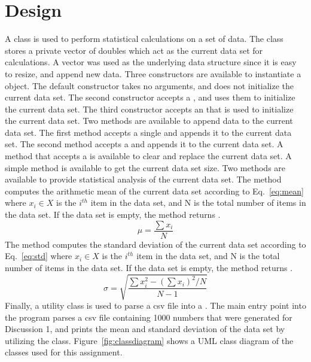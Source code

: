 \documentclass[letterpaper]{article}
\begin{document}

\section{Design}
A  class is used to perform statistical calculations on a set of data. The class stores a private vector of doubles which act as the current data set for calculations. A vector was used as the underlying data structure since it is easy to resize, and append new data. Three constructors are available to instantiate a  object. The default constructor takes no arguments, and does not initialize the current data set. The second constructor accepts a , and uses them to initialize the current data set. The third constructor accepts an  that is used to initialize the current data set. Two methods are available to append data to the current data set. The first  method accepts a single  and appends it to the current data set. The second  method accepts a 
and appends it to the current data set. A  method that accepts a  is available to clear and replace the current data set. A simple  method is available to get the current data set size. Two methods are available to provide statistical analysis of the current data set. The  method computes the arithmetic mean of the current data set according to Eq.~\eqref{eq:mean} where $x_i\in X$ is the $i^{th}$ item in the data set, and N is the total number of items in the data set. If the data set is empty, the method returns .
\begin{equation}
    \mu = \frac{\sum x_i}{N}
    \label{eq:mean}
\end{equation}
The  method computes the standard deviation of the current data set according to Eq.~\eqref{eq:std} where $x_i \in X$ is the $i^{th}$ item in the data set, and N is the total number of items in the data set. If the data set is empty, the method returns .
\begin{equation}
    \sigma = \sqrt{\frac{\sum x_i^2 - \left( \sum x_i \right)^2/N}{N-1}}
    \label{eq:std}
\end{equation}
Finally, a utility class  is used to parse a csv file into a . The main entry point into the program parses a csv file containing 1000 numbers that were generated for Discussion 1, and prints the mean and standard deviation of the data set by utilizing the  class. Figure~\ref{fig:classdiagram} shows a UML class diagram of the classes used for this assignment.
\end{document}
